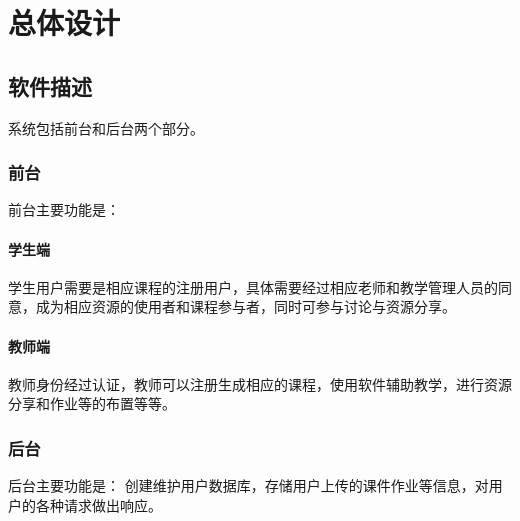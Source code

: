\chapter{总体设计}
\section{软件描述}
系统包括前台和后台两个部分。

\subsection{前台}
前台主要功能是：
\subsubsection{学生端}
学生用户需要是相应课程的注册用户，具体需要经过相应老师和教学管理人员的同意，成为相应资源的使用者和课程参与者，同时可参与讨论与资源分享。

\subsubsection{教师端}
教师身份经过认证，教师可以注册生成相应的课程，使用软件辅助教学，进行资源分享和作业等的布置等等。

\subsection{后台}
后台主要功能是：
创建维护用户数据库，存储用户上传的课件作业等信息，对用户的各种请求做出响应。


